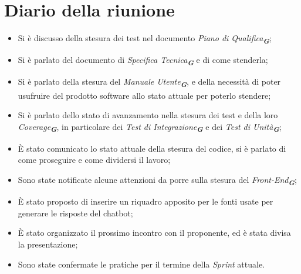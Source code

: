 
\section{Diario della riunione}

\begin{itemize}
    \item Si è discusso della stesura dei test nel documento \emph{Piano di Qualifica}\textsubscript{\textit{\textbf{G}}};
    \item Si è parlato del documento di \emph{Specifica Tecnica}\textsubscript{\textit{\textbf{G}}} e di come stenderla;
    \item Si è parlato della stesura del \emph{Manuale Utente}\textsubscript{\textit{\textbf{G}}}, e della necessità di poter usufruire del prodotto software allo stato attuale per poterlo stendere;
    \item Si è parlato dello stato di avanzamento nella stesura dei test e della loro \emph{Coverage}\textsubscript{\textit{\textbf{G}}}, in particolare dei \emph{Test di Integrazione}\textsubscript{\textit{\textbf{G}}} e dei \emph{Test di Unità}\textsubscript{\textit{\textbf{G}}};
    \item È stato comunicato lo stato attuale della stesura del codice, si è parlato di come proseguire e come dividersi il lavoro;
    \item Sono state notificate alcune attenzioni da porre sulla stesura del \emph{Front-End}\textsubscript{\textit{\textbf{G}}};
    \item È stato proposto di inserire un riquadro apposito per le fonti usate per generare le risposte del chatbot;
    \item È stato organizzato il prossimo incontro con il proponente, ed è stata divisa la presentazione;
    \item Sono state confermate le pratiche per il termine della \emph{Sprint} attuale.
\end{itemize}


